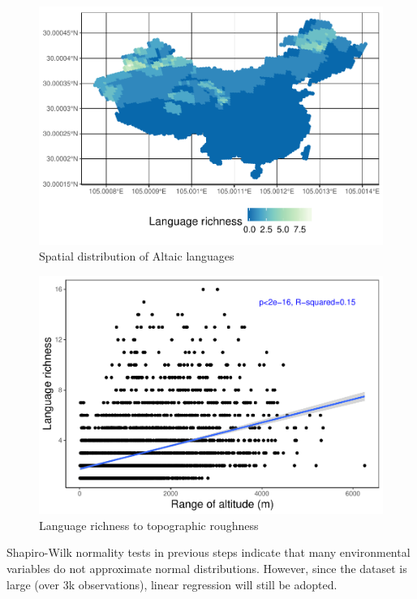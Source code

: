 \documentclass[12pt,]{article}
\begin{document}
\begin{figure}
\centering
\includegraphics{Project_Template_files/figure-latex/unnamed-chunk-8-1.pdf}
\caption{Spatial distribution of Altaic languages}
\end{figure}

\begin{figure}
\centering
\includegraphics{Project_Template_files/figure-latex/unnamed-chunk-9-1.pdf}
\caption{Language richness to topographic roughness}
\end{figure}

Shapiro-Wilk normality tests in previous steps indicate that many
environmental variables do not approximate normal distributions.
However, since the dataset is large (over 3k observations), linear
regression will still be adopted.
\end{document}

